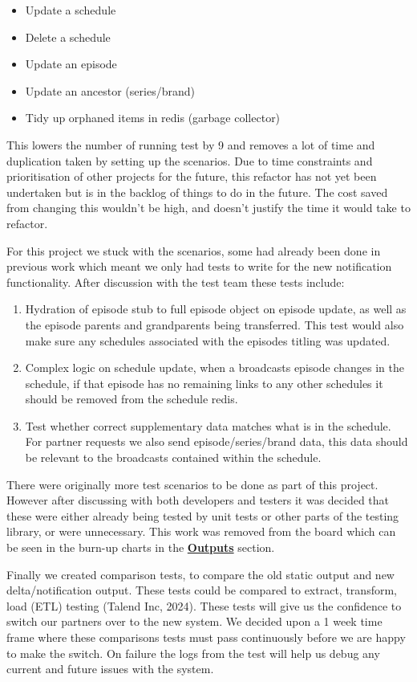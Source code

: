   \begin{itemize}
    \item Update a schedule
    \item Delete a schedule
    \item Update an episode
    \item Update an ancestor (series/brand)
    \item Tidy up orphaned items in redis (garbage collector)
  \end{itemize}

  This lowers the number of running test by 9 and removes a lot of time and duplication taken by setting up the scenarios. Due to time constraints and 
  prioritisation of other projects for the future, this refactor has not yet been undertaken but is in the backlog of things to do in the future. The 
  cost saved from changing this wouldn't be high, and doesn't justify the time it would take to refactor.

  For this project we stuck with the scenarios, some had already been done in previous work which meant we only had tests to write for the new 
  notification functionality. After discussion with the test team these tests include:

  \begin{enumerate}
    \item Hydration of episode stub to full episode object on episode update, as well as the episode parents and grandparents being transferred. This
    test would also make sure any schedules associated with the episodes titling was updated.
    \item Complex logic on schedule update, when a broadcasts episode changes in the schedule, if that episode has no remaining links to any other 
    schedules it should be removed from the schedule redis.
    \item Test whether correct supplementary data matches what is in the schedule. For partner requests we also send episode/series/brand data, 
    this data should be relevant to the broadcasts contained within the schedule.
  \end{enumerate}

  There were originally more test scenarios to be done as part of this project. However after discussing with both developers and testers it was decided 
  that these were either already being tested by unit tests or other parts of the testing library, or were unnecessary. This work was removed from 
  the board which can be seen in the burn-up charts in the \hyperref[sec:burnup]{\textbf{Outputs}} section.

  Finally we created comparison tests, to compare the old static output and new delta/notification output. These tests could be compared to extract, 
  transform, load (ETL) testing (Talend Inc, 2024). These tests will give us the confidence to switch our partners over to the new system. We decided
  upon a 1 week time frame where these comparisons tests must pass continuously before we are happy to make the switch. On failure the logs from the test
  will help us debug any current and future issues with the system.

  \newpage